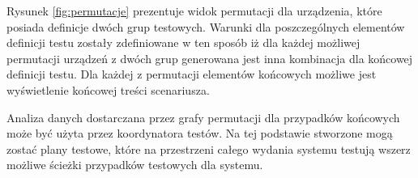 Rysunek \ref{fig:permutacje}  prezentuje widok permutacji dla urządzenia, które posiada definicje dwóch grup testowych. Warunki dla poszczególnych elementów definicji testu zostały zdefiniowane w ten sposób iż dla każdej możliwej permutacji urządzeń z dwóch grup generowana jest inna kombinacja dla końcowej definicji testu. Dla każdej z permutacji elementów końcowych możliwe jest wyświetlenie końcowej treści scenariusza.

Analiza danych dostarczana przez grafy permutacji dla przypadków końcowych może być użyta przez koordynatora testów. Na tej podstawie stworzone mogą zostać plany testowe, które na przestrzeni całego wydania systemu testują wszerz możliwe ścieżki przypadków testowych dla systemu.

\begin{figure}[h]
\centering
{}\qquad
{}\\

\end{figure}
